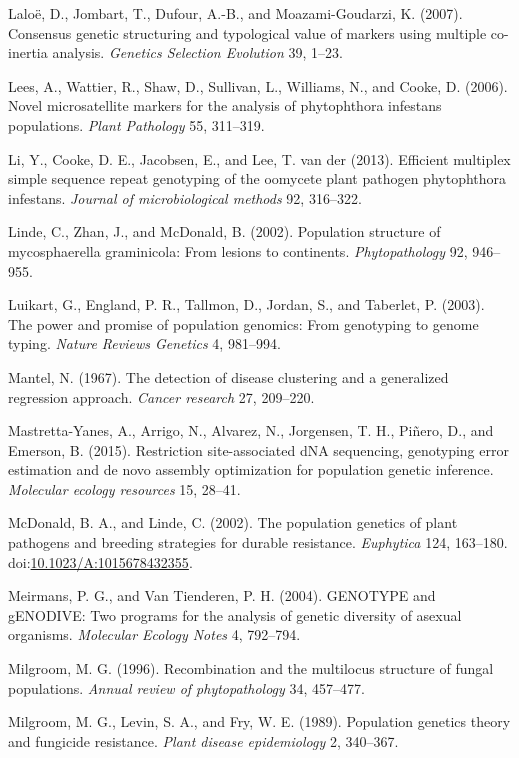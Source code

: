 \documentclass{frontiersSCNS} %
\begin{document}
Lalo{ë}, D., Jombart, T., Dufour, A.-B., and Moazami-Goudarzi, K.
(2007). Consensus genetic structuring and typological value of markers
using multiple co-inertia analysis. \emph{Genetics Selection Evolution}
39, 1--23.

Lees, A., Wattier, R., Shaw, D., Sullivan, L., Williams, N., and Cooke,
D. (2006). Novel microsatellite markers for the analysis of phytophthora
infestans populations. \emph{Plant Pathology} 55, 311--319.

Li, Y., Cooke, D. E., Jacobsen, E., and Lee, T. van der (2013).
Efficient multiplex simple sequence repeat genotyping of the oomycete
plant pathogen phytophthora infestans. \emph{Journal of microbiological
methods} 92, 316--322.

Linde, C., Zhan, J., and McDonald, B. (2002). Population structure of
mycosphaerella graminicola: From lesions to continents.
\emph{Phytopathology} 92, 946--955.

Luikart, G., England, P. R., Tallmon, D., Jordan, S., and Taberlet, P.
(2003). The power and promise of population genomics: From genotyping to
genome typing. \emph{Nature Reviews Genetics} 4, 981--994.

Mantel, N. (1967). The detection of disease clustering and a generalized
regression approach. \emph{Cancer research} 27, 209--220.

Mastretta-Yanes, A., Arrigo, N., Alvarez, N., Jorgensen, T. H.,
Pi{ñ}ero, D., and Emerson, B. (2015). Restriction site-associated dNA
sequencing, genotyping error estimation and de novo assembly
optimization for population genetic inference. \emph{Molecular ecology
resources} 15, 28--41.

McDonald, B. A., and Linde, C. (2002). The population genetics of plant
pathogens and breeding strategies for durable resistance.
\emph{Euphytica} 124, 163--180.
doi:\href{http://dx.doi.org/10.1023/A:1015678432355}{10.1023/A:1015678432355}.

Meirmans, P. G., and Van Tienderen, P. H. (2004). GENOTYPE and gENODIVE:
Two programs for the analysis of genetic diversity of asexual organisms.
\emph{Molecular Ecology Notes} 4, 792--794.

Milgroom, M. G. (1996). Recombination and the multilocus structure of
fungal populations. \emph{Annual review of phytopathology} 34, 457--477.

Milgroom, M. G., Levin, S. A., and Fry, W. E. (1989). Population
genetics theory and fungicide resistance. \emph{Plant disease
epidemiology} 2, 340--367.
\end{document}
